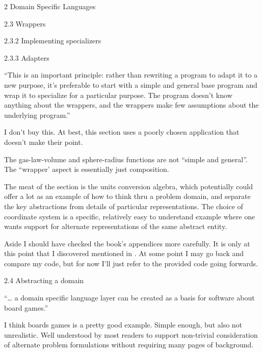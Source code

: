 \documentclass[12pt]{PalisadesLakesBook}
\begin{document}
\begin{plSection}{2 Domain Specific Languages}
\begin{plSection}{2.3 Wrappers}
\begin{plSection}{2.3.2 Implementing specializers}
\end{plSection}%
\begin{plSection}{2.3.3 Adapters}

``This is an important principle:
rather than rewriting a program to adapt it to a new purpose,
it's preferable to start with a simple and general base program
and wrap it to specialize for a particular purpose.
The program doesn't know anything about the wrappers,
and the wrappers make few assumptions about the underlying 
program.''

I don't buy this.
At best, this section uses a poorly chosen application
that doesn't make their point.

The {\clojureFont gas-law-volume} and {\clojureFont sphere-radius}
functions are not ``simple and general''.
The ``wrapper' aspect is essentially just composition.

The meat of the section is the units conversion algebra,
which potentially could offer a lot as an example of how
to think thru a problem domain,
and separate the key abstractions 
from details of particular representations.
The choice of coordinate system is a specific, relatively easy
to understand example where one wants support for alternate 
representations of the same abstract entity.

\end{plSection}%
\end{plSection}%
\begin{plSection}{Aside}
\NOTE 
I should have checked the book's appendices more carefully.
It is only at this point that I discovered
mentioned in 
.
At some point I may go back and compare my code, 
but for now I'll just refer to the provided code going forwards.
\end{plSection}%
\begin{plSection}{2.4 Abstracting a domain}

``{\ldots} a domain specific language layer can be created
as a basis for software about board games.''

I think boards games is a pretty good example.
Simple enough, but also not unrealistic.
Well understood by most readers to support non-trivial
consideration of alternate problem formulations
without requiring many pages of background.


\end{plSection}
\end{plSection}
\end{document}
